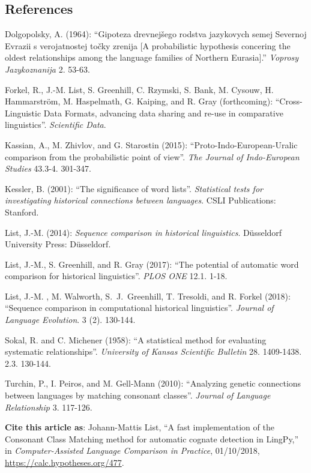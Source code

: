 \documentclass[
  english,
  a4paper,
  oneside,tablecaptionabove
]{scrbook}
\begin{document}
\hypertarget{references}{\subsection*{References}\label{references}}

Dolgopolsky, A. (1964): ``Gipoteza drevnejšego rodstva
jazykovych semej Severnoj Evrazii s verojatnostej točky zrenija {[}A
probabilistic hypothesis concering the oldest relationships among the
language families of Northern Eurasia{]}.'' \emph{Voprosy Jazykoznanija}
2. 53-63.

Forkel, R., J.-M. List, S. Greenhill, C. Rzymski, S. Bank, M.
Cysouw, H. Hammarström, M. Haspelmath, G. Kaiping, and R. Gray
(forthcoming): ``Cross-Linguistic Data Formats, advancing data
sharing and re-use in comparative linguistics''. \emph{Scientific Data}.

Kassian, A., M. Zhivlov, and G. Starostin (2015):
``Proto-Indo-European-Uralic comparison from the probabilistic
point of view''. \emph{The Journal of Indo-European Studies} 43.3-4.
301-347.

Kessler, B. (2001): ``The significance of word lists''.
\emph{Statistical tests for investigating historical connections
between languages}. CSLI Publications: Stanford.

List, J.-M. (2014): \emph{Sequence comparison in historical
linguistics}. Düsseldorf University Press: Düsseldorf.

List, J.-M., S. Greenhill, and R. Gray (2017): ``The potential
of automatic word comparison for historical linguistics''. \emph{PLOS
ONE} 12.1. 1-18.

List, J.-M. , M. Walworth, S.~J.~Greenhill, T. Tresoldi, and R.
Forkel (2018): ``Sequence comparison in computational historical
linguistics''. \emph{Journal of Language Evolution}. 3 (2). 130-144.

Sokal, R. and C. Michener (1958): ``A statistical method for
evaluating systematic relationships''. \emph{University of Kansas
Scientific Bulletin} 28. 1409-1438. 2.3. 130-144.

Turchin, P., I. Peiros, and M. Gell-Mann (2010): ``Analyzing
genetic connections between languages by matching consonant classes''.
\emph{Journal of Language Relationship} 3. 117-126.

\textbf{Cite this article as}: Johann-Mattis List, ``A fast
implementation of the Consonant Class Matching method for automatic
cognate detection in LingPy,'' in \emph{Computer-Assisted Language
Comparison in Practice}, 01/10/2018,
\url{https://calc.hypotheses.org/477}.
\end{document}
